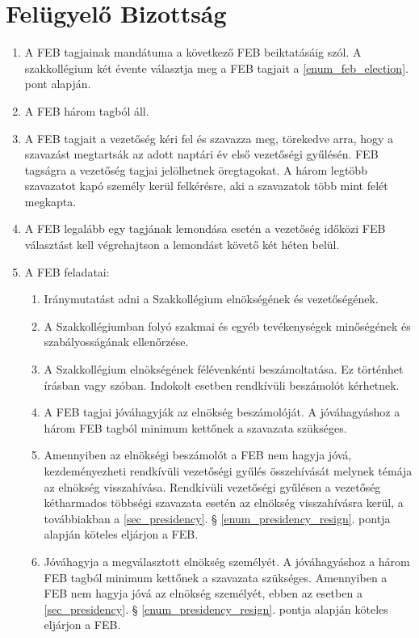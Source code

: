\documentclass[12pt]{report}
\begin{document}
\section{Felügyelő Bizottság} \label{sec_supervisory_board}

\begin{enumerate}
  \item A FEB tagjainak mandátuma a következő FEB beiktatásáig szól. A szakkollégium két évente választja meg a FEB tagjait a \ref{enum_feb_election}. pont alapján.
  \item A FEB három tagból áll.
  \item A FEB tagjait a vezetőség kéri fel és szavazza meg, törekedve arra, hogy a szavazást megtartsák az adott naptári év első vezetőségi gyűlésén. FEB tagságra a 
    vezetőség tagjai jelölhetnek öregtagokat. A három legtöbb szavazatot kapó személy kerül felkérésre, aki a szavazatok több mint felét megkapta. \label{enum_feb_election}
  \item A FEB legalább egy tagjának lemondása esetén a vezetőség időközi FEB választást kell végrehajtson a lemondást követő két héten belül.
  \item A FEB feladatai:
  \begin{enumerate}
    \item Iránymutatást adni a Szakkollégium elnökségének és vezetőségének.
    \item A Szakkollégiumban folyó szakmai és egyéb tevékenységek minőségének és szabályosságának ellenőrzése.
    \item A Szakkollégium elnökségének félévenkénti beszámoltatása. Ez történhet írásban vagy szóban. Indokolt esetben rendkívüli beszámolót kérhetnek.
    \item A FEB tagjai jóváhagyják az elnökség beszámolóját. A jóváhagyáshoz a három FEB tagból minimum kettőnek a szavazata szükséges.
    \item Amennyiben az elnökségi beszámolót a FEB nem hagyja jóvá, kezdeményezheti rendkívüli vezetőségi gyűlés összehívását melynek témája az elnökség visszahívása. 
      Rendkívüli vezetőségi gyűlésen a vezetőség kétharmados többségi szavazata esetén az elnökség visszahívásra kerül, a továbbiakban a \ref{sec_presidency}. § \ref{enum_presidency_resign}. pontja alapján köteles eljárjon a FEB.
    \item Jóváhagyja a megválasztott elnökség személyét. A jóváhagyáshoz a három FEB tagból minimum kettőnek a szavazata szükséges. Amennyiben a FEB nem hagyja jóvá az 
      elnökség személyét, ebben az esetben a \ref{sec_presidency}. § \ref{enum_presidency_resign}. pontja alapján köteles eljárjon a FEB.

\end{enumerate}
\end{enumerate}
\end{document}

